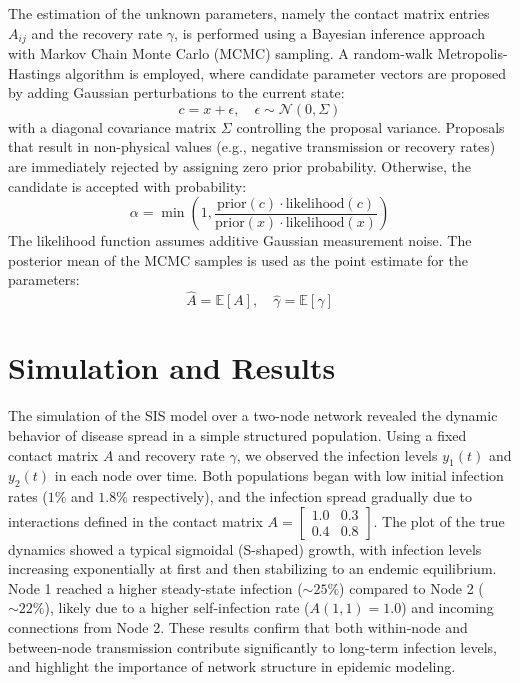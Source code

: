 \documentclass[a4paper,10pt]{report}
\begin{document}
The estimation of the unknown parameters, namely the contact matrix entries $A_{ij}$ and the recovery rate $\gamma$, is performed using a Bayesian inference approach with Markov Chain Monte Carlo (MCMC) sampling. A random-walk Metropolis-Hastings algorithm is employed, where candidate parameter vectors are proposed by adding Gaussian perturbations to the current state:
\[
c = x + \epsilon, \quad \epsilon \sim \mathcal{N}(0, \Sigma)
\]
with a diagonal covariance matrix $\Sigma$ controlling the proposal variance. Proposals that result in non-physical values (e.g., negative transmission or recovery rates) are immediately rejected by assigning zero prior probability. Otherwise, the candidate is accepted with probability:
\[
\alpha = \min \left(1, \frac{\text{prior}(c) \cdot \text{likelihood}(c)}{\text{prior}(x) \cdot \text{likelihood}(x)} \right)
\]
The likelihood function assumes additive Gaussian measurement noise. The posterior mean of the MCMC samples is used as the point estimate for the parameters:
\[
\hat{A} = \mathbb{E}[A], \quad \hat{\gamma} = \mathbb{E}[\gamma]
\]


\section{Simulation and Results}

The simulation of the SIS model over a two-node network revealed the dynamic behavior of disease spread in a simple structured population. Using a fixed contact matrix $A$ and recovery rate $\gamma$, we observed the infection levels $y_1(t)$ and $y_2(t)$ in each node over time. Both populations began with low initial infection rates ($1\%$ and $1.8\%$ respectively), and the infection spread gradually due to interactions defined in the contact matrix $A = \begin{bmatrix} 1.0 & 0.3 \\ 0.4 & 0.8 \end{bmatrix}$. The plot of the true dynamics showed a typical sigmoidal (S-shaped) growth, with infection levels increasing exponentially at first and then stabilizing to an endemic equilibrium. Node 1 reached a higher steady-state infection ($\sim 25\%$) compared to Node 2 ($\sim 22\%$), likely due to a higher self-infection rate ($A(1,1) = 1.0$) and incoming connections from Node 2. These results confirm that both within-node and between-node transmission contribute significantly to long-term infection levels, and highlight the importance of network structure in epidemic modeling.
\end{document}
